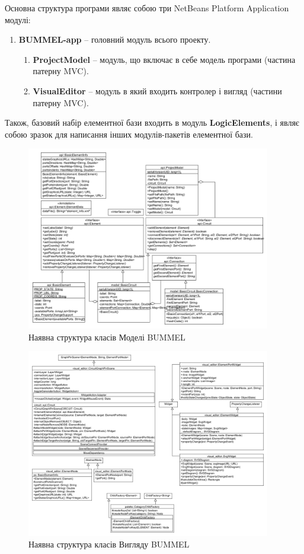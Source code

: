 \documentclass[12pt,a4paper]{article}
\begin{document}
Основна структура програми являє собою три NetBeans Platform Application модулі:
\begin{enumerate}
  \item \textbf{BUMMEL-app} -- головний модуль всього проекту.
  \begin{enumerate}
    \item \textbf{ProjectModel} -- модуль, що включає в себе модель програми (частина патерну MVC).
    \item \textbf{VisualEditor} -- модуль в який входить контролер і вигляд (частини патерну MVC).
  \end{enumerate}
\end{enumerate}
Також, базовий набір елементної бази входить в модуль \textbf{LogicElements}, і являє собою зразок для написання інших модулів-пакетів елементної бази.

\begin{figure}[h]
  \centering
    \includegraphics[width=0.95\textwidth]{class-diagram-model.png}
  \caption{Наявна структура класів Моделі BUMMEL\label{structModel}}
\end{figure}

\begin{figure}[h]
  \centering
    \includegraphics[width=0.95\textwidth]{class-diagram-view-NBVL.png}
  \caption{Наявна структура класів Вигляду BUMMEL\label{structView}}
\end{figure}
\end{document}
